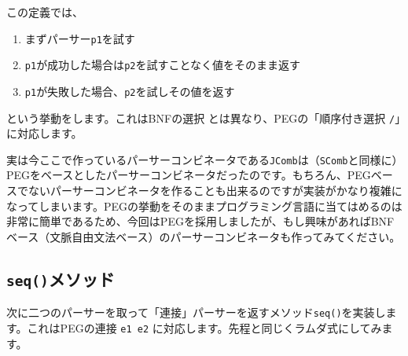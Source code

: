 この定義では、

\begin{enumerate}
\def\labelenumi{\arabic{enumi}.}
\tightlist
\item
  まずパーサー\texttt{p1}を試す
\item
  \texttt{p1}が成功した場合は\texttt{p2}を試すことなく値をそのまま返す
\item
  \texttt{p1}が失敗した場合、\texttt{p2}を試しその値を返す
\end{enumerate}

という挙動をします。これはBNFの選択 \texttt{\textbar{}}
とは異なり、PEGの「順序付き選択 \texttt{/}」に対応します。

実は今ここで作っているパーサーコンビネータである\texttt{JComb}は（\texttt{SComb}と同様に）PEGをベースとしたパーサーコンビネータだったのです。もちろん、PEGベースでないパーサーコンビネータを作ることも出来るのですが実装がかなり複雑になってしまいます。PEGの挙動をそのままプログラミング言語に当てはめるのは非常に簡単であるため、今回はPEGを採用しましたが、もし興味があればBNFベース（文脈自由文法ベース）のパーサーコンビネータも作ってみてください。

\hypertarget{chapter6-sequx30e1ux30bdux30c3ux30c9}{%
\subsection{\texorpdfstring{\texttt{seq()}メソッド}{seq()メソッド}}\label{chapter6-sequx30e1ux30bdux30c3ux30c9}}

次に二つのパーサーを取って「連接」パーサーを返すメソッド\texttt{seq()}を実装します。これはPEGの連接
\texttt{e1\ e2} に対応します。先程と同じくラムダ式にしてみます。

